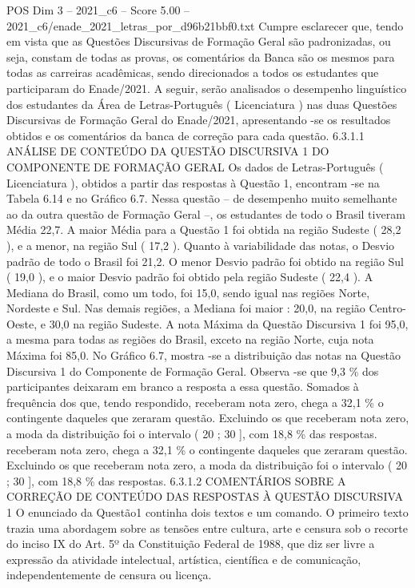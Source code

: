 \begin{textsample}{POS Dim 3 – 2021\_c6 – Score 5.00 – 2021\_c6/enade\_2021\_letras\_por\_d96b21bbf0.txt}
Cumpre esclarecer que, tendo em vista que as Questões Discursivas de Formação Geral são padronizadas, ou seja, constam de todas as provas, os comentários da Banca são os mesmos para todas as carreiras acadêmicas, sendo direcionados a todos os estudantes que participaram do Enade/2021.
A seguir, serão analisados o desempenho linguístico dos estudantes da Área de Letras-Português ( Licenciatura ) nas duas Questões Discursivas de Formação Geral do Enade/2021, apresentando -se os resultados obtidos e os comentários da banca de correção para cada questão. 6.3.1.1 ANÁLISE DE CONTEÚDO DA QUESTÃO DISCURSIVA 1 DO COMPONENTE DE FORMAÇÃO GERAL Os dados de Letras-Português ( Licenciatura ), obtidos a partir das respostas à Questão 1, encontram -se na Tabela 6.14 e no Gráfico 6.7.
Nessa questão – de desempenho muito semelhante ao da outra questão de Formação Geral –, os estudantes de todo o Brasil tiveram Média 22,7.
A maior Média para a Questão 1 foi obtida na região Sudeste ( 28,2 ), e a menor, na região Sul ( 17,2 ).
Quanto à variabilidade das notas, o Desvio padrão de todo o Brasil foi 21,2.
O menor Desvio padrão foi obtido na região Sul ( 19,0 ), e o maior Desvio padrão foi obtido pela região Sudeste ( 22,4 ).
A Mediana do Brasil, como um todo, foi 15,0, sendo igual nas regiões Norte, Nordeste e Sul.
Nas demais regiões, a Mediana foi maior : 20,0, na região Centro-Oeste, e 30,0 na região Sudeste.
A nota Máxima da Questão Discursiva 1 foi 95,0, a mesma para todas as regiões do Brasil, exceto na região Norte, cuja nota Máxima foi 85,0.
No Gráfico 6.7, mostra -se a distribuição das notas na Questão Discursiva 1 do Componente de Formação Geral.
Observa -se que 9,3 \% dos participantes deixaram em branco a resposta a essa questão.
Somados à frequência dos que, tendo respondido, receberam nota zero, chega a 32,1 \% o contingente daqueles que zeraram questão.
Excluindo os que receberam nota zero, a moda da distribuição foi o intervalo ( 20 ; 30 ], com 18,8 \% das respostas. receberam nota zero, chega a 32,1 \% o contingente daqueles que zeraram questão.
Excluindo os que receberam nota zero, a moda da distribuição foi o intervalo ( 20 ; 30 ], com 18,8 \% das respostas. 6.3.1.2 COMENTÁRIOS SOBRE A CORREÇÃO DE CONTEÚDO DAS RESPOSTAS À QUESTÃO DISCURSIVA 1 O enunciado da Questão1 continha dois textos e um comando.
O primeiro texto trazia uma abordagem sobre as tensões entre cultura, arte e censura sob o recorte do inciso IX do Art. 5º da Constituição Federal de 1988, que diz ser livre a expressão da atividade intelectual, artística, científica e de comunicação, independentemente de censura ou licença.

\end{textsample}
